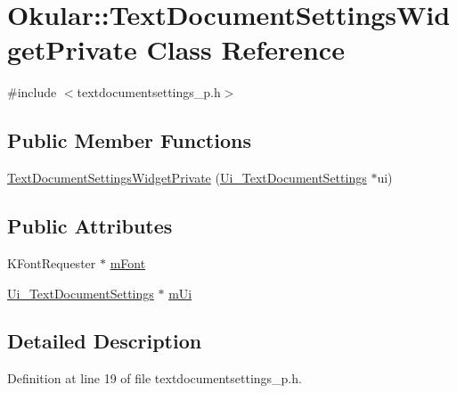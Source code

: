 \hypertarget{classOkular_1_1TextDocumentSettingsWidgetPrivate}{\section{Okular\+:\+:Text\+Document\+Settings\+Widget\+Private Class Reference}
\label{classOkular_1_1TextDocumentSettingsWidgetPrivate}
}


{\ttfamily \#include $<$textdocumentsettings\+\_\+p.\+h$>$}

\subsection*{Public Member Functions}
\begin{DoxyCompactItemize}
\item 
\hyperlink{classOkular_1_1TextDocumentSettingsWidgetPrivate_a509529e31f2dc64f32f504a4607a3773}{Text\+Document\+Settings\+Widget\+Private} (\hyperlink{classUi__TextDocumentSettings}{Ui\+\_\+\+Text\+Document\+Settings} $\ast$ui)
\end{DoxyCompactItemize}
\subsection*{Public Attributes}
\begin{DoxyCompactItemize}
\item 
K\+Font\+Requester $\ast$ \hyperlink{classOkular_1_1TextDocumentSettingsWidgetPrivate_aaeb3db2be0c26a00d0936258083b161a}{m\+Font}
\item 
\hyperlink{classUi__TextDocumentSettings}{Ui\+\_\+\+Text\+Document\+Settings} $\ast$ \hyperlink{classOkular_1_1TextDocumentSettingsWidgetPrivate_a07370b4ba0b71279eabd2dc859cec07c}{m\+Ui}
\end{DoxyCompactItemize}


\subsection{Detailed Description}


Definition at line 19 of file textdocumentsettings\+\_\+p.\+h.



